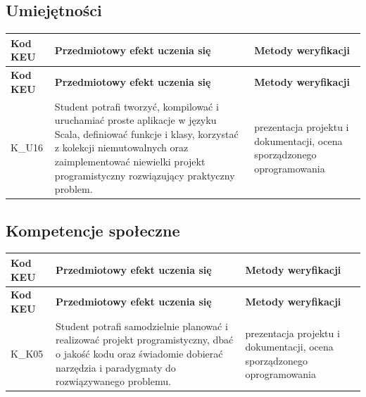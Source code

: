 \documentclass[12pt, a4paper]{article}
\newcommand{\thdrule}{\noalign{\global\setlength{\extrarowheight}{0pt}}}
\newcommand{\thdend}{\noalign{\global\setlength{\extrarowheight}{3pt}}}
\begin{document}
\subsection*{Umiejętności}
{\scriptsize
\begin{longtable}{m{1.6cm}m{9.0cm}m{4.2cm}}
\thdrule\toprule
\rowcolor{pjatkRed} {\color{white}\footnotesize\textbf{\vphantom{Ag}Kod KEU}} & {\color{white}\footnotesize\textbf{\vphantom{Ag}Przedmiotowy efekt uczenia się}} & {\color{white}\footnotesize\textbf{\vphantom{Ag}Metody weryfikacji}} \\
\midrule\thdend
\endfirsthead
\thdrule\toprule
\rowcolor{pjatkRed} {\color{white}\footnotesize\textbf{\vphantom{Ag}Kod KEU}} & {\color{white}\footnotesize\textbf{\vphantom{Ag}Przedmiotowy efekt uczenia się}} & {\color{white}\footnotesize\textbf{\vphantom{Ag}Metody weryfikacji}} \\
\midrule\thdend
\endhead
  \rowcolor{tableRowLight} K\_U16 & Student potrafi tworzyć, kompilować i uruchamiać proste aplikacje w języku Scala, definiować funkcje i klasy, korzystać z kolekcji niemutowalnych oraz zaimplementować niewielki projekt programistyczny rozwiązujący praktyczny problem. & prezentacja projektu i dokumentacji, ocena sporządzonego oprogramowania \\
\bottomrule
\end{longtable}}

\subsection*{Kompetencje społeczne}
{\scriptsize
\begin{longtable}{m{1.6cm}m{9.0cm}m{4.2cm}}
\thdrule\toprule
\rowcolor{pjatkRed} {\color{white}\footnotesize\textbf{\vphantom{Ag}Kod KEU}} & {\color{white}\footnotesize\textbf{\vphantom{Ag}Przedmiotowy efekt uczenia się}} & {\color{white}\footnotesize\textbf{\vphantom{Ag}Metody weryfikacji}} \\
\midrule\thdend
\endfirsthead
\thdrule\toprule
\rowcolor{pjatkRed} {\color{white}\footnotesize\textbf{\vphantom{Ag}Kod KEU}} & {\color{white}\footnotesize\textbf{\vphantom{Ag}Przedmiotowy efekt uczenia się}} & {\color{white}\footnotesize\textbf{\vphantom{Ag}Metody weryfikacji}} \\
\midrule\thdend
\endhead
  \rowcolor{tableRowLight} K\_K05 & Student potrafi samodzielnie planować i realizować projekt programistyczny, dbać o jakość kodu oraz świadomie dobierać narzędzia i paradygmaty do rozwiązywanego problemu. & prezentacja projektu i dokumentacji, ocena sporządzonego oprogramowania \\
\bottomrule
\end{longtable}}
\end{document}
